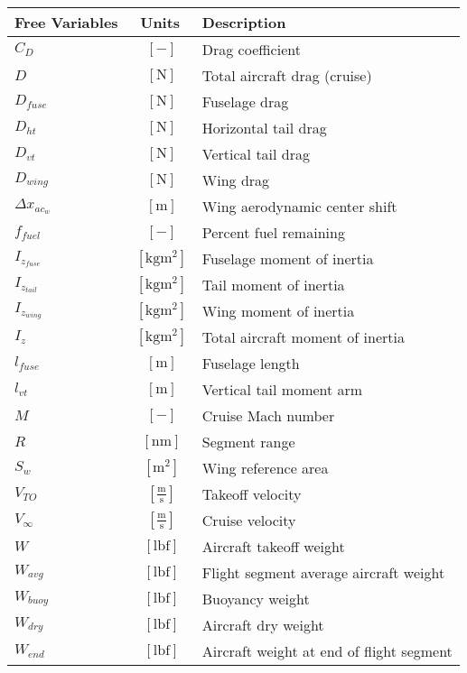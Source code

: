 % 

{\footnotesize
\begin{supertabular}{lcl}
\toprule
Free Variables & Units & Description \\ \midrule
$C_D$ & $~[-]$ & Drag coefficient \\
$D$ & $~\mathrm{[N]}$ & Total aircraft drag (cruise) \\
$D_{fuse}$ & $~\mathrm{[N]}$ & Fuselage drag \\
$D_{ht}$ & $~\mathrm{[N]}$ & Horizontal tail drag \\
$D_{vt}$ & $~\mathrm{[N]}$ & Vertical tail drag \\
$D_{wing}$ & $~\mathrm{[N]}$ & Wing drag \\
$\Delta x_{ac_w}$ & $~\mathrm{[m]}$ & Wing aerodynamic center shift \\
$f_{fuel}$ & $~\mathrm{[-]}$ & Percent fuel remaining \\
$I_{z_{fuse}}$ & $~\mathrm{[kg m^2]}$ & Fuselage moment of inertia\\
$I_{z_{tail}}$ & $~\mathrm{[kg m^2]}$ & Tail moment of inertia\\
$I_{z_{wing}}$ & $~\mathrm{[kg m^2]}$ & Wing moment of inertia\\
$I_{z}$ & $~\mathrm{[kg m^2]}$ & Total aircraft moment of inertia\\
$l_{fuse}$ & $~\mathrm{[m]}$ & Fuselage length \\
$l_{vt}$ & $~\mathrm{[m]}$ & Vertical tail moment arm \\
$M$ & $~[-]$ & Cruise Mach number \\
$R$ & $~\mathrm{[nm]}$ & Segment range\\
$S_w$ & $~\mathrm{[m^{2}]}$ & Wing reference area \\
$V_{TO}$ & $~\mathrm{[\tfrac{m}{s}]}$ & Takeoff velocity \\
$V_{\infty}$ & $~\mathrm{[\tfrac{m}{s}]}$ & Cruise velocity \\
$W$ & $~\mathrm{[lbf]}$ & Aircraft takeoff weight \\
$W_{avg}$ & $~\mathrm{[lbf]}$ & Flight segment average aircraft weight\\
$W_{buoy}$ & $~\mathrm{[lbf]}$ & Buoyancy weight \\
$W_{dry}$ & $~\mathrm{[lbf]}$ & Aircraft dry weight\\
$W_{end}$ & $~\mathrm{[lbf]}$ & Aircraft weight at end of flight segment\\

\end{supertabular}}
